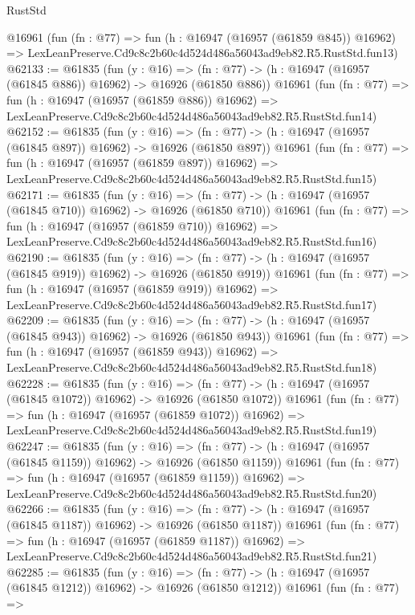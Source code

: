 \begin{lexlean}{RustStd}
\begin{coremodule}
    @16961
    (fun (fn : @77) =>
    fun (h : @16947 (@16957 (@61859 @845)) @16962) =>
    LexLeanPreserve.Cd9c8c2b60c4d524d486a56043ad9eb82.R5.RustStd.fun13)
@62133 := @61835
    (fun (y : @16) =>
    (fn : @77) -> (h : @16947 (@16957 (@61845 @886)) @16962) -> @16926 (@61850 @886))
    @16961
    (fun (fn : @77) =>
    fun (h : @16947 (@16957 (@61859 @886)) @16962) =>
    LexLeanPreserve.Cd9c8c2b60c4d524d486a56043ad9eb82.R5.RustStd.fun14)
@62152 := @61835
    (fun (y : @16) =>
    (fn : @77) -> (h : @16947 (@16957 (@61845 @897)) @16962) -> @16926 (@61850 @897))
    @16961
    (fun (fn : @77) =>
    fun (h : @16947 (@16957 (@61859 @897)) @16962) =>
    LexLeanPreserve.Cd9c8c2b60c4d524d486a56043ad9eb82.R5.RustStd.fun15)
@62171 := @61835
    (fun (y : @16) =>
    (fn : @77) -> (h : @16947 (@16957 (@61845 @710)) @16962) -> @16926 (@61850 @710))
    @16961
    (fun (fn : @77) =>
    fun (h : @16947 (@16957 (@61859 @710)) @16962) =>
    LexLeanPreserve.Cd9c8c2b60c4d524d486a56043ad9eb82.R5.RustStd.fun16)
@62190 := @61835
    (fun (y : @16) =>
    (fn : @77) -> (h : @16947 (@16957 (@61845 @919)) @16962) -> @16926 (@61850 @919))
    @16961
    (fun (fn : @77) =>
    fun (h : @16947 (@16957 (@61859 @919)) @16962) =>
    LexLeanPreserve.Cd9c8c2b60c4d524d486a56043ad9eb82.R5.RustStd.fun17)
@62209 := @61835
    (fun (y : @16) =>
    (fn : @77) -> (h : @16947 (@16957 (@61845 @943)) @16962) -> @16926 (@61850 @943))
    @16961
    (fun (fn : @77) =>
    fun (h : @16947 (@16957 (@61859 @943)) @16962) =>
    LexLeanPreserve.Cd9c8c2b60c4d524d486a56043ad9eb82.R5.RustStd.fun18)
@62228 := @61835
    (fun (y : @16) =>
    (fn : @77) -> (h : @16947 (@16957 (@61845 @1072)) @16962) -> @16926 (@61850 @1072))
    @16961
    (fun (fn : @77) =>
    fun (h : @16947 (@16957 (@61859 @1072)) @16962) =>
    LexLeanPreserve.Cd9c8c2b60c4d524d486a56043ad9eb82.R5.RustStd.fun19)
@62247 := @61835
    (fun (y : @16) =>
    (fn : @77) -> (h : @16947 (@16957 (@61845 @1159)) @16962) -> @16926 (@61850 @1159))
    @16961
    (fun (fn : @77) =>
    fun (h : @16947 (@16957 (@61859 @1159)) @16962) =>
    LexLeanPreserve.Cd9c8c2b60c4d524d486a56043ad9eb82.R5.RustStd.fun20)
@62266 := @61835
    (fun (y : @16) =>
    (fn : @77) -> (h : @16947 (@16957 (@61845 @1187)) @16962) -> @16926 (@61850 @1187))
    @16961
    (fun (fn : @77) =>
    fun (h : @16947 (@16957 (@61859 @1187)) @16962) =>
    LexLeanPreserve.Cd9c8c2b60c4d524d486a56043ad9eb82.R5.RustStd.fun21)
@62285 := @61835
    (fun (y : @16) =>
    (fn : @77) -> (h : @16947 (@16957 (@61845 @1212)) @16962) -> @16926 (@61850 @1212))
    @16961
    (fun (fn : @77) =>

\end{coremodule}
\end{lexlean}
